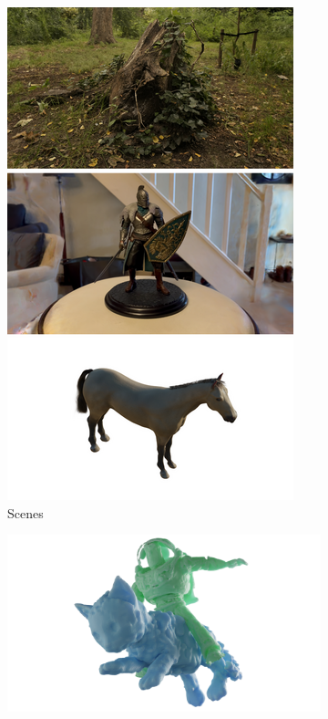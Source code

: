 \begin{figure}[ht]
\begin{subfigure}{0.14\linewidth}
 \includegraphics[width=\linewidth]{images/composition/knight_and_horse/scenes.png}
 \caption{Scenes}
  \end{subfigure}
  \hfill
  \begin{subfigure}{0.42\linewidth}
 \includegraphics[width=\linewidth]{images/composition/buzz_riding_cat/mesh.png}

\end{subfigure}
\end{figure}
